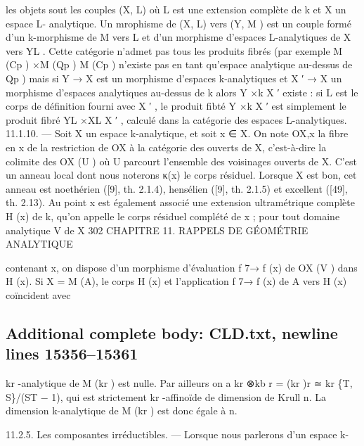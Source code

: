 \documentclass[
  10pt,
]{article}
\newenvironment{Shaded}{}{}
\newcommand{\NormalTok}[1]{#1}
\begin{document}
\begin{Shaded}
\begin{Highlighting}[]
\NormalTok{les objets sout les couples (X, L) où L est une extension complète de k et X un espace L{-}}
\NormalTok{analytique. Un mrophisme de (X, L) vers (Y, M ) est un couple formé d’un k{-}morphisme}
\NormalTok{de M vers L et d’un morphisme d’espaces L{-}analytiques de X vers YL .}
\NormalTok{   Cette catégorie n’admet pas tous les produits fibrés (par exemple M (Cp ) ×M (Qp )}
\NormalTok{M (Cp ) n’existe pas en tant qu’espace analytique au{-}dessus de Qp ) mais si Y → X est}
\NormalTok{un morphisme d’espaces k{-}analytiques et X ′ → X un morphisme d’espaces analytiques}
\NormalTok{au{-}dessus de k alors Y ×k X ′ existe : si L est le corps de définition fourni avec X ′ , le}
\NormalTok{produit fibté Y ×k X ′ est simplement le produit fibré YL ×XL X ′ , calculé dans la catégorie}
\NormalTok{des espaces L{-}analytiques.}
\NormalTok{11.1.10. — Soit X un espace k{-}analytique, et soit x ∈ X.}
\NormalTok{   On note OX,x la fibre en x de la restriction de OX à la catégorie des ouverts de X,}
\NormalTok{c’est{-}à{-}dire la colimite des OX (U ) où U parcourt l’ensemble des voisinages ouverts de}
\NormalTok{X. C’est un anneau local dont nous noterons κ(x) le corps résiduel.}
\NormalTok{   Lorsque X est bon, cet anneau est noethérien ([9], th. 2.1.4), hensélien ([9], th. 2.1.5)}
\NormalTok{et excellent ([49], th. 2.13).}
\NormalTok{   Au point x est également associé une extension ultramétrique complète H (x) de k,}
\NormalTok{qu’on appelle le corps résiduel complété de x ; pour tout domaine analytique V de X}
\NormalTok{302                  CHAPITRE 11. RAPPELS DE GÉOMÉTRIE ANALYTIQUE}

\NormalTok{contenant x, on dispose d’un morphisme d’évaluation f 7→ f (x) de OX (V ) dans H (x).}
\NormalTok{Si X = M (A), le corps H (x) et l’application f 7→ f (x) de A vers H (x) coïncident avec}
\end{Highlighting}
\end{Shaded}

\subsection{Additional complete body: CLD.txt, newline lines
15356--15361}\label{additional-complete-body-cld.txt-newline-lines-1535615361}

\begin{Shaded}
\begin{Highlighting}[]
\NormalTok{kr {-}analytique de M (kr ) est nulle. Par ailleurs on a kr ⊗kb r = (kr )r ≃ kr \{T, S\}/(ST − 1),}
\NormalTok{qui est strictement kr {-}affinoïde de dimension de Krull n. La dimension k{-}analytique de}
\NormalTok{M (kr ) est donc égale à n.}


\NormalTok{11.2.5. Les composantes irréductibles. — Lorsque nous parlerons d’un espace k{-}}
\end{Highlighting}
\end{Shaded}
\end{document}
